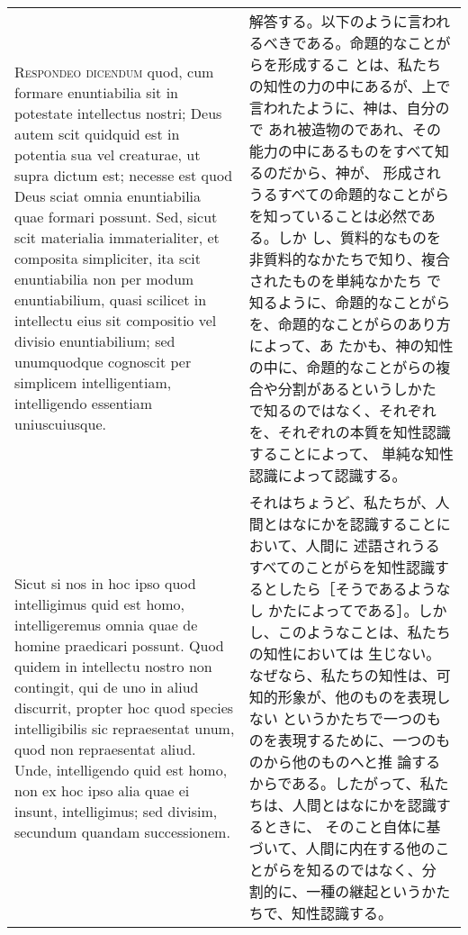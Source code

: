 \documentclass[10pt]{jsarticle} %
\begin{document}
\begin{longtable}{p{21em}p{21em}}
\\


{\scshape Respondeo dicendum} quod, cum formare enuntiabilia sit in
potestate intellectus nostri; Deus autem scit quidquid est in potentia
sua vel creaturae, ut supra dictum est; necesse est quod Deus sciat
omnia enuntiabilia quae formari possunt. Sed, sicut scit materialia
immaterialiter, et composita simpliciter, ita scit enuntiabilia non
per modum enuntiabilium, quasi scilicet in intellectu eius sit
compositio vel divisio enuntiabilium; sed unumquodque cognoscit per
simplicem intelligentiam, intelligendo essentiam uniuscuiusque.

&

解答する。以下のように言われるべきである。命題的なことがらを形成するこ
とは、私たちの知性の力の中にあるが、上で言われたように、神は、自分ので
あれ被造物のであれ、その能力の中にあるものをすべて知るのだから、神が、
形成されうるすべての命題的なことがらを知っていることは必然である。しか
し、質料的なものを非質料的なかたちで知り、複合されたものを単純なかたち
で知るように、命題的なことがらを、命題的なことがらのあり方によって、あ
たかも、神の知性の中に、命題的なことがらの複合や分割があるというしかた
で知るのではなく、それぞれを、それぞれの本質を知性認識することによって、
単純な知性認識によって認識する。

\\


Sicut si nos in hoc ipso quod intelligimus quid est homo,
intelligeremus omnia quae de homine praedicari possunt. Quod quidem in
intellectu nostro non contingit, qui de uno in aliud discurrit,
propter hoc quod species intelligibilis sic repraesentat unum, quod
non repraesentat aliud. Unde, intelligendo quid est homo, non ex hoc
ipso alia quae ei insunt, intelligimus; sed divisim, secundum quandam
successionem.



&

それはちょうど、私たちが、人間とはなにかを認識することにおいて、人間に
述語されうるすべてのことがらを知性認識するとしたら［そうであるようなし
かたによってである］。しかし、このようなことは、私たちの知性においては
生じない。なぜなら、私たちの知性は、可知的形象が、他のものを表現しない
というかたちで一つのものを表現するために、一つのものから他のものへと推
論するからである。したがって、私たちは、人間とはなにかを認識するときに、
そのこと自体に基づいて、人間に内在する他のことがらを知るのではなく、分
割的に、一種の継起というかたちで、知性認識する。

\\



\end{longtable}
\end{document}
